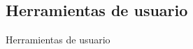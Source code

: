 \subsection{Herramientas de usuario}





Herramientas de usuario



%
%
%
%
%
%
%
%
%
%
%	
%		
%
%		
%		
%		
%		




